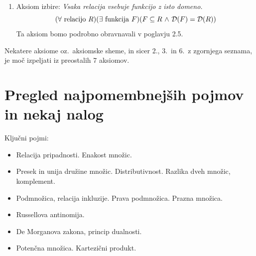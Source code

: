 \documentclass[11pt,paper=b5,footinclude,headinclude]{scrbook} %
\def\inn {{~\wedge~}}
\def\sledi {{~\Rightarrow~}}
\def\cee {{~\Leftrightarrow~}}
\begin{document}
\begin{enumerate}
\item Aksiom izbire: \emph{ Vsaka relacija vsebuje funkcijo z isto domeno.}
$$(\forall \textrm{ relacijo }R)(\exists \textrm{ funkcija }F)(F\subseteq R \inn {\cal D}(F) = {\cal D}(R))$$
Ta aksiom bomo podrobno obravnavali v poglavju 2.5.






\end{enumerate}

Nekatere aksiome oz.~aksiomske sheme, in sicer 2., 3.~in 6.~z zgornjega seznama, je moč izpeljati iz preostalih 7 aksiomov.

\section{Pregled najpomembnejših pojmov in nekaj nalog}

Ključni pojmi:
\begin{itemize}
  \item Relacija pripadnosti. Enakost množic.
  \item Presek in unija družine množic. Distributivnost. Razlika dveh množic, komplement.
  \item Podmnožica, relacija inkluzije. Prava podmnožica. Prazna množica.
  \item Russellova antinomija.
  \item De Morganova zakona, princip dualnosti.
  \item Potenčna množica. Kartezični produkt.
\end{itemize}
\end{document}
